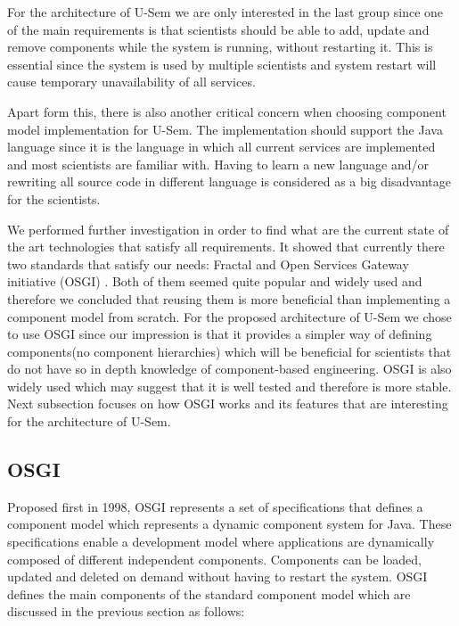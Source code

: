 For the architecture of U-Sem we are only interested in the last group since one of the main requirements is that scientists should be able to add, update and remove components while the system is running, without restarting it. This is essential since the system is used by multiple scientists and system restart will cause temporary unavailability of all services. 

Apart form this, there is also another critical concern when choosing component model implementation for U-Sem. The implementation should support the Java language since it is the language in which all current services are implemented and most scientists are familiar with. Having to learn a new language and/or rewriting all source code in different language is considered as a big disadvantage for the scientists.

We performed further investigation in order to find what are the current state of the art technologies that satisfy all requirements. It showed that currently there two standards that satisfy our needs: Fractal \cite{Bruneton} and Open Services Gateway initiative (OSGI) \cite{OSGI}. Both of them seemed quite popular and widely used and therefore we concluded that reusing them is more beneficial than implementing a component model from scratch. For the proposed architecture of U-Sem we chose to use OSGI since our impression is that it provides a simpler way of defining components(no component hierarchies) which will be beneficial for scientists that do not have so in depth knowledge of component-based engineering. OSGI is also widely used\cite{Andre} which may suggest that it is well tested and therefore is more stable. Next subsection focuses on how OSGI works and its features that are interesting for the architecture of U-Sem.


\subsection{OSGI}

Proposed first in 1998, OSGI represents a set of specifications that defines a component model which represents a dynamic component system for Java. These specifications enable a development model where applications are dynamically composed of different independent components. Components can be loaded, updated and deleted on demand without having to restart the system. OSGI defines the main components of the standard component model which are discussed in the previous section as follows:

